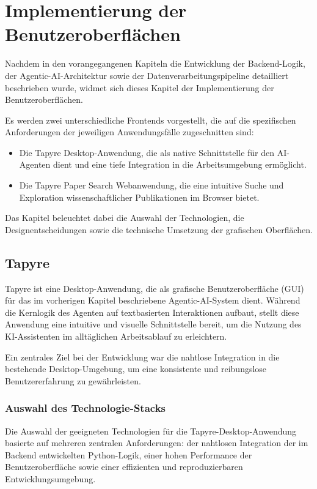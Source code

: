 \chapter{Implementierung der Benutzeroberflächen}

Nachdem in den vorangegangenen Kapiteln die Entwicklung der Backend-Logik, der Agentic-AI-Architektur sowie der Datenverarbeitungspipeline detailliert beschrieben wurde, widmet sich dieses Kapitel der Implementierung der Benutzeroberflächen.

Es werden zwei unterschiedliche Frontends vorgestellt, die auf die spezifischen Anforderungen der jeweiligen Anwendungsfälle zugeschnitten sind:
\begin{itemize}
	\item Die Tapyre Desktop-Anwendung, die als native Schnittstelle für den AI-Agenten dient und eine tiefe Integration in die Arbeitsumgebung ermöglicht.
	\item Die Tapyre Paper Search Webanwendung, die eine intuitive Suche und Exploration wissenschaftlicher Publikationen im Browser bietet.
\end{itemize}

Das Kapitel beleuchtet dabei die Auswahl der Technologien, die Designentscheidungen sowie die technische Umsetzung der grafischen Oberflächen.

\section{Tapyre}

Tapyre ist eine Desktop-Anwendung, die als grafische Benutzeroberfläche (GUI) für das im vorherigen Kapitel beschriebene Agentic-AI-System dient. Während die Kernlogik des Agenten auf textbasierten Interaktionen aufbaut, stellt diese Anwendung eine intuitive und visuelle Schnittstelle bereit, um die Nutzung des KI-Assistenten im alltäglichen Arbeitsablauf zu erleichtern.

Ein zentrales Ziel bei der Entwicklung war die nahtlose Integration in die bestehende Desktop-Umgebung, um eine konsistente und reibungslose Benutzererfahrung zu gewährleisten.

\subsection{Auswahl des Technologie-Stacks}

Die Auswahl der geeigneten Technologien für die Tapyre-Desktop-Anwendung basierte auf mehreren zentralen Anforderungen: der nahtlosen Integration der im Backend entwickelten Python-Logik, einer hohen Performance der Benutzeroberfläche sowie einer effizienten und reproduzierbaren Entwicklungsumgebung.


